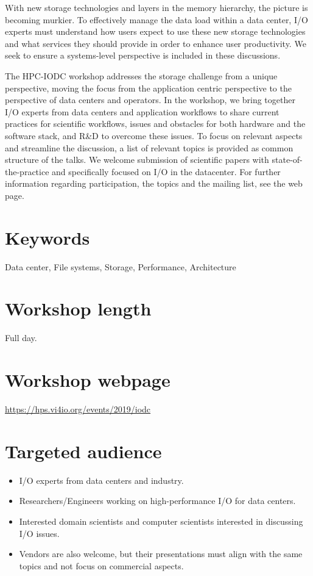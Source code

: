 \documentclass[a4paper,10pt]{article}
\begin{document}
With new storage technologies and layers in the memory hierarchy, the picture is becoming murkier.
To effectively manage the data load within a data center, I/O experts must understand how users expect to use these new storage technologies and what services they should provide in order to enhance user productivity. We seek to ensure a systems-level perspective is included in these discussions.

The HPC-IODC workshop addresses the storage challenge from a unique perspective, moving the focus from the application centric perspective to the perspective of data centers and operators.
In the workshop, we bring together I/O experts from data centers and application workflows to share current practices for scientific workflows, issues and obstacles for both hardware and the software stack, and R\&D to overcome these issues.
To focus on relevant aspects and streamline the discussion, a list of relevant topics is provided as common structure of the talks.
We welcome submission of scientific papers with state-of-the-practice and specifically focused on I/O in the  datacenter.
For further information regarding participation, the topics and the mailing list, see the web page.

\section{Keywords}
Data center, File systems, Storage, Performance, Architecture

\section{Workshop length}
Full day.

\section{Workshop webpage}
\url{https://hps.vi4io.org/events/2019/iodc}


\section{Targeted audience}
\begin{itemize}
\item I/O experts from data centers and industry.
\item Researchers/Engineers working on high-performance I/O for data centers.
\item Interested domain scientists and computer scientists interested in discussing I/O issues.
\item Vendors are also welcome, but their presentations must align with the same topics and not focus on commercial aspects.
\end{itemize}
\end{document}
